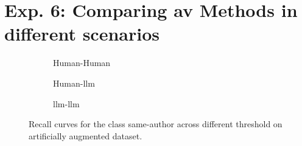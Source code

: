 \section{Exp. 6: Comparing \ac{av} Methods in different scenarios}
\label{sec:app_detection_scenarios}

%     


\begin{figure}[htbp]
  \centering
  \begin{subfigure}[b]{0.31\textwidth}
    \centering
    
    \caption{Human-Human}
    \label{fig:detec_scen_human-human_recall}
  \end{subfigure}
  \hfill
  \begin{subfigure}[b]{0.31\textwidth}
    \centering
    
    \caption{Human-\ac{llm}}
    \label{fig:detec_scen_human-llm_recall}
  \end{subfigure}
  \hfill
  \begin{subfigure}[b]{0.31\textwidth}
    \centering
    
    \caption{\ac{llm}-\ac{llm}}
    \label{fig:detec_scen_llm-llm_recall}
    \end{subfigure}
  \caption{Recall curves for the class same-author across different threshold on artificially augmented \dataStudent{} dataset.}
  \label{fig:detec_scen_recall}
\end{figure}
